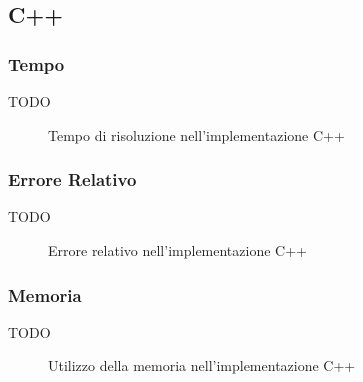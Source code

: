 \documentclass[11pt,italian]{article}
\begin{document}
\subsection{C++}
\subsubsection*{Tempo}
TODO
\begin{figure}[H]
    \caption{Tempo di risoluzione nell'implementazione C++}
    \label{fig:cpp-time}
\end{figure}

\subsubsection*{Errore Relativo}
TODO
\begin{figure}[H]
    \caption{Errore relativo nell'implementazione C++}
    \label{fig:cpp-error}
\end{figure}

\subsubsection*{Memoria}
TODO
\begin{figure}[H]
    \caption{Utilizzo della memoria nell'implementazione C++}
    \label{fig:cpp-memory}
\end{figure}
\end{document}
